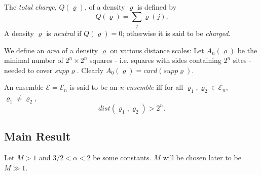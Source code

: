 \documentclass[11pt,reqno]{article}
\theoremstyle{definition}
\numberwithin{equation}{section}
\begin{document}
The \textit{total charge}, $Q(\varrho)$, of a density $\varrho$ is defined by
$$
Q(\varrho) = \sum_j\varrho(j).
$$
A density $\varrho$ is \textit{neutral} if $Q(\varrho)=0$; otherwise it is said to be \textit{charged}.

We define an \textit{area} of a density $\varrho$ on various distance scales: Let $A_n(\varrho)$ be the minimal number of $2^n \times 2^n$ squares - i.e. squares with sides containing $2^n$ sites - needed to cover $supp\varrho$. Clearly $A_0(\varrho) = card(supp\varrho)$.

An ensemble $\mathscr{E} = \mathscr{E}_n$ is said to be an \textit{n-ensemble} iff for all $\varrho_1, \varrho_2 \in \mathscr{E}_n$, $\varrho_1 \neq \varrho_2$,
$$
dist(\varrho_1, \varrho_2) > 2^n.
$$

\subsection{Main Result}
Let $M > 1$ and $3/2 < \alpha < 2$ be some constants. $M$ will be chosen later to be $M \gg 1$.
\end{document}
